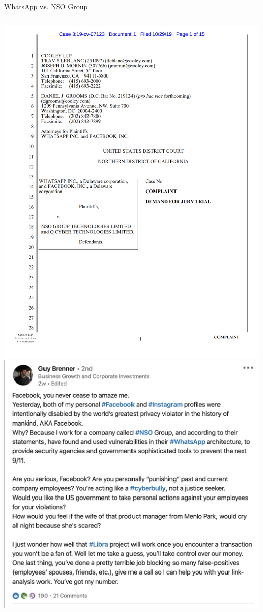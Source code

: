 \documentclass[nobackground,dvipsnames,table,aspectratio=169]{beamer}
\begin{document}
\begin{frame}{WhatsApp vs. NSO Group}
    \begin{columns}
            \includegraphics[width=\textwidth]{whatsapp-vs-nso-court-doc}
            \includegraphics[width=\textwidth]{nso-rant}
    \end{columns}
\end{frame}
\end{document}
